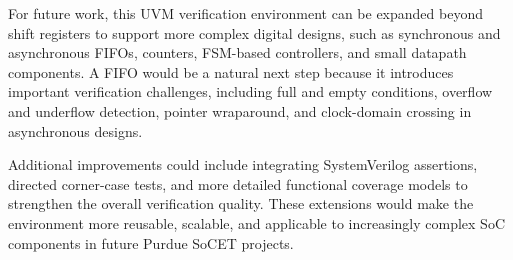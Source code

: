 
For future work, this UVM verification environment can be expanded beyond shift registers to support more complex digital designs, such as synchronous and asynchronous FIFOs, counters, FSM-based controllers, and small datapath components. A FIFO would be a natural next step because it introduces important verification challenges, including full and empty conditions, overflow and underflow detection, pointer wraparound, and clock-domain crossing in asynchronous designs.

Additional improvements could include integrating SystemVerilog assertions, directed corner-case tests, and more detailed functional coverage models to strengthen the overall verification quality. These extensions would make the environment more reusable, scalable, and applicable to increasingly complex SoC components in future Purdue SoCET projects.